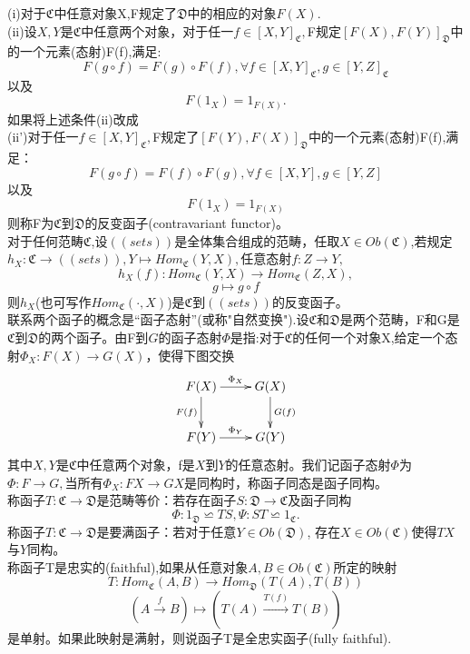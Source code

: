 \documentclass[UTF8]{article}
\begin{document}
  (i)对于$\mathfrak{C}$中任意对象X,F规定了$\mathfrak{D}$中的相应的对象$F(X).$\\
  (ii)设$X,Y$是$\mathfrak{C}$中任意两个对象，对于任一$f\in [X,Y]_{\mathfrak{C}},$F规定$[F(X),F(Y)]_{\mathfrak{D}}$中的一个元素(态射)F(f),满足:\\
  $$F(g\circ f)=F(g)\circ F(f),\forall f\in[X,Y]_{\mathfrak{C}},g\in [Y,Z]_{\mathfrak{C}} 
  $$
  以及$$
  F(1_{X})=1_{F(X)}.
  $$
  如果将上述条件(ii)改成\\
  (ii')对于任一$f\in [X,Y]_{\mathfrak{C}},$F规定了$[F(Y),F(X)]_{\mathfrak{D}}$中的一个元素(态射)F(f),满足：\\
  $$
  F(g\circ f)=F(f)\circ F(g),\forall f\in [X,Y],g\in [Y,Z]
  $$
  以及$$
  F(1_{X})=1_{F(X)}
  $$
  则称F为$\mathfrak{C}$到$\mathfrak{D}$的反变函子(contravariant functor)。\\
  对于任何范畴$\mathfrak{C}$,设$((sets))$是全体集合组成的范畴，任取$X\in Ob(\mathfrak{C})$,若规定$h_{X}:\mathfrak{C}\rightarrow ((sets)),Y\mapsto Hom_{\mathfrak{C}}(Y,X),$任意态射$f:Z\rightarrow Y,$
  $$h_{X}(f):Hom_{\mathfrak{C}}(Y,X)\rightarrow Hom_{\mathfrak{C}}(Z,X),$$
  $$g\mapsto g\circ f$$
  则$h_{X}$(也可写作$Hom_{\mathfrak{C}}(\cdot,X)$)是$\mathfrak{C}$到$((sets))$的反变函子。\\
  联系两个函子的概念是“函子态射”(或称"自然变换").设$\mathfrak{C}$和$\mathfrak{D}$是两个范畴，F和G是$\mathfrak{C}$到$\mathfrak{D}$的两个函子。由F到$G$的函子态射$\Phi$是指:对于$\mathfrak{C}$的任何一个对象X,给定一个态射$\Phi_{X}:F(X)\rightarrow G(X)$，使得下图交换
  $$
\xymatrix{F(X)\ar[r]^{\Phi_{X}}\ar[d]_{F(f)}&G(X)\ar[d]^{G(f)}\\
F(Y)\ar[r]^{\Phi_{Y}}&G(Y)}
  $$
  其中$X,Y$是$\mathfrak{C}$中任意两个对象，f是$X$到$Y$的任意态射。我们记函子态射$\Phi$为$\Phi:F\rightarrow G,$当所有$\Phi_{X}:FX\rightarrow GX$是同构时，称函子同态是函子同构。\\
  称函子$T:\mathfrak{C}\rightarrow \mathfrak{D}$是范畴等价：若存在函子$S:\mathfrak{D}\rightarrow \mathfrak{C}$及函子同构
  $$
  \Phi: 1_{\mathfrak{D}}\backsimeq TS,\Psi :ST\backsimeq 1_{\mathfrak{C}}.
  $$
  称函子$T:\mathfrak{C}\rightarrow \mathfrak{D}$是要满函子：若对于任意$Y\in Ob(\mathfrak{D})$,
存在$X\in Ob(\mathfrak{C})$使得$TX$与$Y$同构。\\
称函子T是忠实的(faithful),如果从任意对象$A,B\in Ob(\mathfrak{C})$所定的映射$$
T:Hom_{\mathfrak{C}}(A,B)\rightarrow Hom_{\mathfrak{D}}(T(A),T(B))
$$
$$
(A\stackrel{f}{\rightarrow }B)\mapsto (T(A)\stackrel{T(f)}{\rightarrow}T(B))
$$
是单射。如果此映射是满射，则说函子T是全忠实函子(fully faithful).\\
\end{document}

